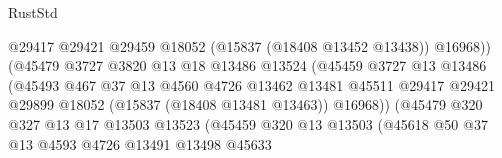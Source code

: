 \begin{lexlean}{RustStd}
\begin{coremodule}
{\begin{coremodule}
{{{{{{{{{{{{{{{{{{{{{{{{{{{{{{{{{{{{{{{{{{{{{{{{{{{{{{{{{{{{                                          @29417
                                          @29421
                                          @29459
                                          @18052
                                          (@15837 (@18408 @13452 @13438))
                                          @16968))
                                      (@45479
                                        @3727
                                        @3820
                                        @13
                                        @18
                                        @13486
                                        @13524
                                        (@45459
                                          @3727
                                          @13
                                          @13486
                                          (@45493
                                            @467
                                            @37
                                            @13
                                            @4560
                                            @4726
                                            @13462
                                            @13481
                                            @45511
                                            @29417
                                            @29421
                                            @29899
                                            @18052
                                            (@15837 (@18408 @13481 @13463))
                                            @16968))
                                        (@45479
                                          @320
                                          @327
                                          @13
                                          @17
                                          @13503
                                          @13523
                                          (@45459
                                            @320
                                            @13
                                            @13503
                                            (@45618
                                              @50
                                              @37
                                              @13
                                              @4593
                                              @4726
                                              @13491
                                              @13498
                                              @45633
}}}}}}}}}}}}}}}}}}}}}}}}}}}}}}}}}}}}}}}}}}}}}}}}}}}}}}}}}}}}
\end{coremodule}}
\end{coremodule}
\end{lexlean}
